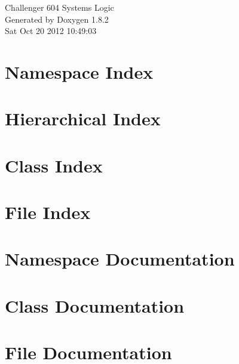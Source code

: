 \documentclass{book}
\begin{document}
\hypersetup{pageanchor=false,citecolor=blue}
\begin{titlepage}
\vspace*{7cm}
\begin{center}
{\Large Challenger 604 Systems Logic }\\
\vspace*{1cm}
{\large Generated by Doxygen 1.8.2}\\
\vspace*{0.5cm}
{\small Sat Oct 20 2012 10:49:03}\\
\end{center}
\end{titlepage}
\clearemptydoublepage
{}
\tableofcontents
\clearemptydoublepage
{}
\hypersetup{pageanchor=true,citecolor=blue}
\chapter{Namespace Index}

\chapter{Hierarchical Index}

\chapter{Class Index}

\chapter{File Index}

\chapter{Namespace Documentation}

\chapter{Class Documentation}











\chapter{File Documentation}

\printindex
\end{document}
